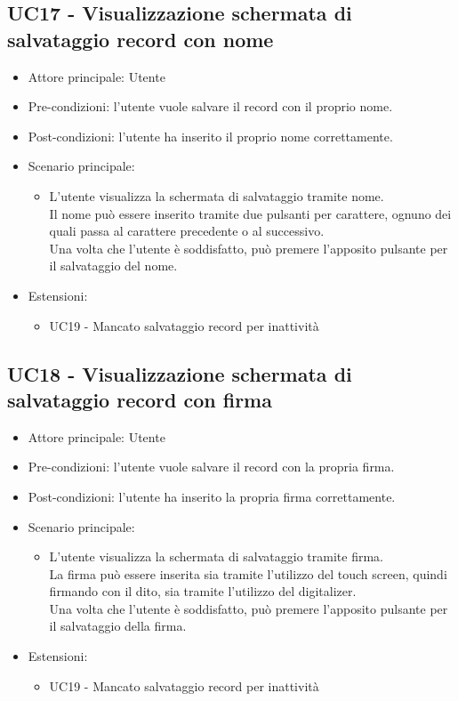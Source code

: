 \subsection{UC17 - Visualizzazione schermata di salvataggio record con nome}
\begin{itemize}
    \item Attore principale: Utente
    \item Pre-condizioni: l'utente vuole salvare il record con il proprio nome.
    \item Post-condizioni: l'utente ha inserito il proprio nome correttamente.
    \item Scenario principale: \begin{itemize}
        \item L'utente visualizza la schermata di salvataggio tramite nome.\\ Il nome può essere inserito tramite due pulsanti per carattere, ognuno dei quali passa al carattere precedente o al successivo.\\ Una volta che l'utente è soddisfatto, può premere l'apposito pulsante per il salvataggio del nome.
    \end{itemize}
    \item Estensioni: \begin{itemize}
        \item UC19 - Mancato salvataggio record per inattività
    \end{itemize}
\end{itemize}


\subsection{UC18 - Visualizzazione schermata di salvataggio record con firma}
\begin{itemize}
    \item Attore principale: Utente
    \item Pre-condizioni: l'utente vuole salvare il record con la propria firma.
    \item Post-condizioni: l'utente ha inserito la propria firma correttamente.
    \item Scenario principale: \begin{itemize}
        \item L'utente visualizza la schermata di salvataggio tramite firma.\\ La firma può essere inserita sia tramite l'utilizzo del touch screen, quindi firmando con il dito, sia tramite l'utilizzo del digitalizer.\\ Una volta che l'utente è soddisfatto, può premere l'apposito pulsante per il salvataggio della firma.
    \end{itemize}
    \item Estensioni: \begin{itemize}
        \item UC19 - Mancato salvataggio record per inattività
    \end{itemize}
\end{itemize}

